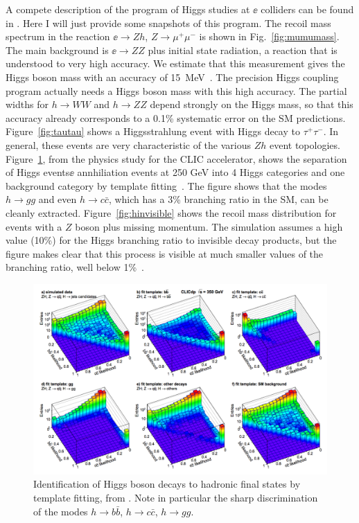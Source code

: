 \documentclass[12pt]{article}
\begin{document}
A compete description of the program of Higgs studies at $\ee$
colliders can be found in \cite{ILCTDR}.   Here I will just provide
some snapshots of this program.   The recoil mass spectrum in the
reaction $\ee\to Zh$, $Z\to \mu^+\mu^-$ is shown in
Fig.~\ref{fig:mumumass}.    The main background is $\ee\to ZZ$ plus
initial state radiation, a reaction that is understood to very high
accuracy.
We estimate that this measurement gives the Higgs boson mass with an
accuracy of 15~MeV~\cite{Recoil1}.   The precision Higgs coupling program actually
needs a Higgs boson mass with this high accuracy. The partial
widths for $h\to WW$ and $h\to ZZ$ depend strongly on the Higgs mass,
so that this accuracy already corresponds to a 0.1\% systematic error
on the SM predictions.   Figure~\ref{fig:tautau} shows a
Higgsstrahlung event with Higgs decay to $\tau^+\tau^-$.   In general,
these events are very characteristic of the various $Zh$ event
topologies.
Figure~\ref{fig:separateHiggs}, from the physics study for the CLIC
accelerator,
 shows the separation of Higgs
events$\ee$ annhiliation events at 250 GeV into 4 Higgs categories and
one background category by template fitting~\cite{CLIC}.   The figure shows that
the modes $h\to gg$ and even $h \to c\bar c$, which has a 3\%
branching ratio in the SM, can be cleanly extracted.
Figure~\ref{fig:hinvisible} shows the recoil mass distribution for
events with a $Z$ boson plus missing momentum.   The simulation
assumes a high value (10\%) for the Higgs branching ratio to invisible 
decay products, but the figure makes  clear that this process is visible at much
smaller values of the branching ratio, well below 1\%~\cite{invisible}.   





\begin{figure}
\begin{center}
\includegraphics[width=0.99\hsize]{CLICHiggsevents.pdf}
\end{center}
\caption{Identification of Higgs boson decays to hadronic final states
  by template fitting, from \cite{CLIC}. Note in particular the sharp
  discrimination of the modes $h\to b\bar b$, $h\to c\bar c$, $h\to gg$.}
\label{fig:separateHiggs}
\end{figure}
\end{document}
